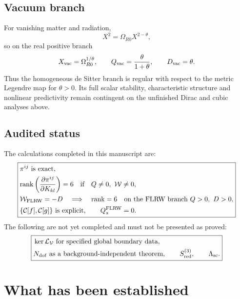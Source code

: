 \documentclass[11pt,a4paper]{article}
\begin{document}
\subsection{Vacuum branch}

For vanishing matter and radiation,
\begin{equation}
 X^2=\Omega_{R0}X^{2-\theta},
\end{equation}
so on the real positive branch
\begin{equation}
 X_{\rm vac}=\Omega_{R0}^{1/\theta},\qquad
 Q_{\rm vac}=\frac{\theta}{1+\theta},\qquad
 D_{\rm vac}=\theta.
\end{equation}
Thus the homogeneous de Sitter branch is regular with respect to the metric
Legendre map for \(\theta>0\).  Its full scalar stability, characteristic
structure and nonlinear predictivity remain contingent on the unfinished
Dirac and cubic analyses above.

\subsection{Audited status}

The calculations completed in this manuscript are:
\begin{equation}
 \boxed{\begin{aligned}
 &\pi^{ij}\ \text{is exact},\\
 &{\rm rank}\left(\frac{\partial\pi^{ij}}{\partial K_{kl}}\right)=6
 \quad\text{if}\quad Q\neq0,\ {\cal W}\neq0,\\
 &{\cal W}_{\rm FLRW}=-D
 \quad\Longrightarrow\quad {\rm rank}=6
 \quad\text{on the FLRW branch }Q>0,\ D>0,\\
 &\{{\cal C}[f],{\cal C}[g]\}\ \text{is explicit},\qquad
 Q_s^{\rm FLRW}=0.
 \end{aligned}}
\end{equation}
The following are not yet completed and must not be presented as proved:
\begin{equation}
 \boxed{\begin{aligned}
 &\ker{\cal L}_{\cal V}\ \text{for specified global boundary data},\\
 &N_{\rm dof}\ \text{as a background-independent theorem},\qquad
 S_{\rm red}^{(3)},\qquad \Lambda_{\rm sc}.
 \end{aligned}}
\end{equation}

\section{What has been established}
\end{document}
